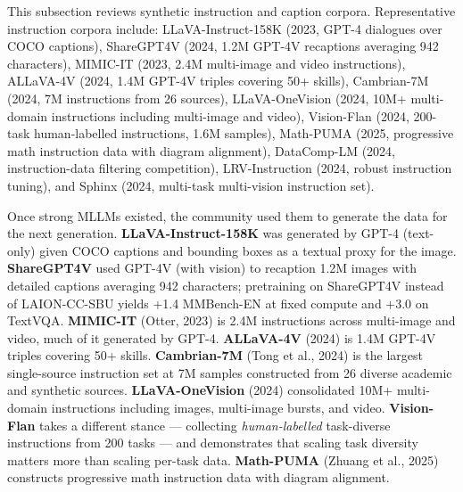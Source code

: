 \documentclass{article}
\begin{document}
This subsection reviews synthetic instruction and caption corpora. Representative instruction corpora include: LLaVA-Instruct-158K (2023, GPT-4 dialogues over COCO captions), ShareGPT4V (2024, 1.2M GPT-4V recaptions averaging 942 characters), MIMIC-IT (2023, 2.4M multi-image and video instructions), ALLaVA-4V (2024, 1.4M GPT-4V triples covering 50+ skills), Cambrian-7M (2024, 7M instructions from 26 sources), LLaVA-OneVision (2024, 10M+ multi-domain instructions including multi-image and video), Vision-Flan (2024, 200-task human-labelled instructions, 1.6M samples), Math-PUMA (2025, progressive math instruction data with diagram alignment), DataComp-LM (2024, instruction-data filtering competition), LRV-Instruction (2024, robust instruction tuning), and Sphinx (2024, multi-task multi-vision instruction set).

Once strong MLLMs existed, the community used them to generate the data for the next generation. \textbf{LLaVA-Instruct-158K} \citep{liu2023visualinstructiont} was generated by GPT-4 (text-only) given COCO captions and bounding boxes as a textual proxy for the image. \textbf{ShareGPT4V} \citep{chen20242024} used GPT-4V (with vision) to recaption 1.2M images with detailed captions averaging 942 characters; pretraining on ShareGPT4V instead of LAION-CC-SBU yields +1.4 MMBench-EN at fixed compute and +3.0 on TextVQA. \textbf{MIMIC-IT} (Otter, 2023) is 2.4M instructions across multi-image and video, much of it generated by GPT-4. \textbf{ALLaVA-4V} (2024) is 1.4M GPT-4V triples covering 50+ skills. \textbf{Cambrian-7M} (Tong et al., 2024) is the largest single-source instruction set at 7M samples constructed from 26 diverse academic and synthetic sources. \textbf{LLaVA-OneVision} (2024) consolidated 10M+ multi-domain instructions including images, multi-image bursts, and video. \textbf{Vision-Flan} \citep{xu2023multimodallearning} takes a different stance --- collecting \emph{human-labelled} task-diverse instructions from 200 tasks --- and demonstrates that scaling task diversity matters more than scaling per-task data. \textbf{Math-PUMA} (Zhuang et al., 2025) constructs progressive math instruction data with diagram alignment.
\end{document}

